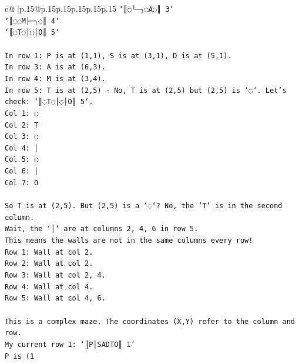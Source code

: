 \documentclass{article}
\begin{document}
{\begin{supertabular}{c@{$\;$}|p{.15\linewidth}@{}p{.15\linewidth}p{.15\linewidth}p{.15\linewidth}p{.15\linewidth}p{.15\linewidth}}
{{{\texttt{`║◌└─┐◌A◌║ 3`} \\
\texttt{`║◌◌M├─┐◌║ 4`} \\
\texttt{`║◌T◌│◌│O║ 5`} \\
\\ 
\texttt{In row 1: P is at (1,1), S is at (3,1), D is at (5,1).} \\
\texttt{In row 3: A is at (6,3).} \\
\texttt{In row 4: M is at (3,4).} \\
\texttt{In row 5: T is at (2,5) {-} No, T is at (2,5) but (2,5) is `◌`. Let's check: `║◌T◌│◌│O║ 5`.} \\
\texttt{Col 1: ◌} \\
\texttt{Col 2: T} \\
\texttt{Col 3: ◌} \\
\texttt{Col 4: │} \\
\texttt{Col 5: ◌} \\
\texttt{Col 6: │} \\
\texttt{Col 7: O} \\
\\ 
\texttt{So T is at (2,5). But (2,5) is a `◌`? No, the `T` is in the second column.} \\
\texttt{Wait, the `│` are at columns 2, 4, 6 in row 5.} \\
\texttt{This means the walls are not in the same columns every row!} \\
\texttt{Row 1: Wall at col 2.} \\
\texttt{Row 2: Wall at col 2.} \\
\texttt{Row 3: Wall at col 2, 4.} \\
\texttt{Row 4: Wall at col 4.} \\
\texttt{Row 5: Wall at col 4, 6.} \\
\\ 
\texttt{This is a complex maze. The coordinates (X,Y) refer to the column and row.} \\
\texttt{My current row 1: `║P│SADTO║ 1`} \\
\texttt{P is (1} \\
            }
        }
    }
     \\ \\


\end{supertabular}}
\end{document}
